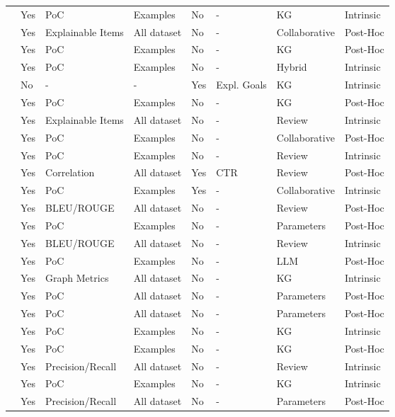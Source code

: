\begin{xltabular}{\textwidth}{l|l|l|l|l|l|l|l}
\cite{9607106} & Yes & PoC & Examples & No & - & KG & Intrinsic \\
\cite{9260076} & Yes & Explainable Items & All dataset & No & - & Collaborative & Post-Hoc \\
\cite{10776491} & Yes & PoC & Examples & No & - & KG & Post-Hoc \\
\cite{9005590} & Yes & PoC & Examples & No & - & Hybrid & Intrinsic \\
\cite{10260804} & No & - & - & Yes & Expl. Goals & KG & Intrinsic \\
\cite{10683822} & Yes & PoC & Examples & No & - & KG & Post-Hoc \\
\cite{9079084} & Yes & Explainable Items & All dataset & No & - & Review & Intrinsic \\
\cite{9836983} & Yes & PoC & Examples & No & - & Collaborative & Post-Hoc \\
\cite{10873804} & Yes & PoC & Examples & No & - & Review & Intrinsic \\
\cite{8594883} & Yes & Correlation & All dataset & Yes & CTR & Review & Post-Hoc \\
\cite{10048787} & Yes & PoC & Examples & Yes & - & Collaborative & Intrinsic \\
\cite{10446052} & Yes & BLEU/ROUGE & All dataset & No & - & Review & Post-Hoc \\
\cite{10827288} & Yes & PoC & Examples & No & - & Parameters & Post-Hoc \\
\cite{9482221} & Yes & BLEU/ROUGE & All dataset & No & - & Review & Intrinsic \\
\cite{10658914} & Yes & PoC & Examples & No & - & LLM & Post-Hoc \\
\cite{10334552} & Yes & Graph Metrics & All dataset & No & - & KG & Intrinsic \\
\cite{10825771} & Yes & PoC & All dataset & No & - & Parameters & Post-Hoc \\
\cite{10308154} & Yes & PoC & All dataset & No & - & Parameters & Post-Hoc \\
\cite{10742303} & Yes & PoC & Examples & No & - & KG & Intrinsic \\
\cite{10623784} & Yes & PoC & Examples & No & - & KG & Post-Hoc \\
\cite{10884422} & Yes & Precision/Recall & All dataset & No & - & Review & Intrinsic \\
\cite{SHIMIZU2022107970} & Yes & PoC & Examples & No & - & KG & Intrinsic \\
\cite{BRUNOT2022102021} & Yes & Precision/Recall & All dataset & No & - & Parameters & Post-Hoc \\

\end{xltabular}
